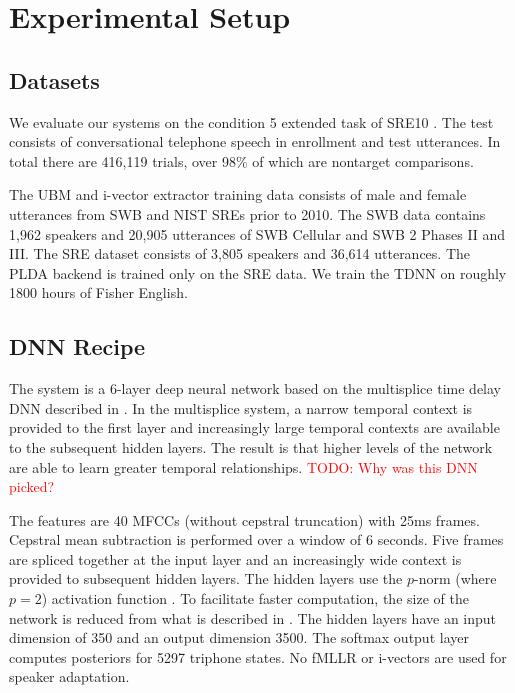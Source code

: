\documentclass{article}
\newcommand\davidnote[1]{\textcolor{red}{#1}}
\begin{document}
\section{Experimental Setup}

\subsection{Datasets}
\label{datasets}
We evaluate our systems on the condition 5 extended task of 
SRE10 \cite{sre10}. The test consists of conversational telephone speech
in enrollment and test utterances. In total there are 416,119 trials,
over 98\% of which are nontarget comparisons. 

The UBM and i-vector extractor training data consists of male and female
utterances from SWB and NIST SREs prior to 2010. The SWB data contains
1,962 speakers and 20,905 utterances of SWB Cellular and SWB 2 
Phases II and III. The SRE dataset consists of 3,805 speakers 
and 36,614 utterances.
The PLDA backend is trained only on the SRE data. 
We train the TDNN on roughly 1800 hours of Fisher English.

\subsection{DNN Recipe}
\label{dnn_recipe}

The system is a 6-layer deep neural network based on the multisplice 
time delay DNN described
in \cite{multisplice}. In the multisplice system, a narrow temporal
context is provided to the first layer and increasingly large temporal
contexts are available to the subsequent hidden layers. The result is that
higher levels of the network are able to learn greater temporal
relationships. \davidnote{TODO: Why was this DNN picked?}

The features are 40 MFCCs (without cepstral
truncation) with 25ms frames. Cepstral mean subtraction is 
performed over a window of
6 seconds. Five frames are spliced together at the
input layer and an increasingly wide context is provided to 
subsequent hidden layers. The hidden layers use the $p$-norm (where $p=2$)
activation function \cite{pnorm}. 
To facilitate faster computation, the size of the network is reduced
from what is described in \cite{multisplice}. The hidden layers have an 
input dimension of 350 and an output dimension 3500. 
The softmax output layer computes posteriors for 5297 triphone states. No
fMLLR or i-vectors are used for speaker adaptation.
\end{document}
